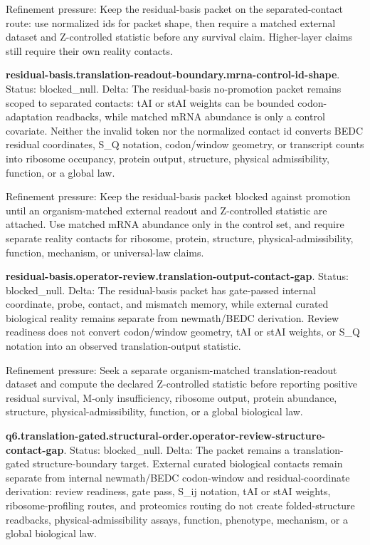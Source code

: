 Refinement pressure: Keep the residual-basis packet on the separated-contact route: use normalized ids for packet shape, then require a matched external dataset and Z-controlled statistic before any survival claim. Higher-layer claims still require their own reality contacts.

\textbf{residual-basis.translation-readout-boundary.mrna-control-id-shape}. Status: blocked\_null. Delta: The residual-basis no-promotion packet remains scoped to separated contacts: tAI or stAI weights can be bounded codon-adaptation readbacks, while matched mRNA abundance is only a control covariate. Neither the invalid token nor the normalized contact id converts BEDC residual coordinates, S\_Q notation, codon/window geometry, or transcript counts into ribosome occupancy, protein output, structure, physical admissibility, function, or a global law.

Refinement pressure: Keep the residual-basis packet blocked against promotion until an organism-matched external readout and Z-controlled statistic are attached. Use matched mRNA abundance only in the control set, and require separate reality contacts for ribosome, protein, structure, physical-admissibility, function, mechanism, or universal-law claims.

\textbf{residual-basis.operator-review.translation-output-contact-gap}. Status: blocked\_null. Delta: The residual-basis packet has gate-passed internal coordinate, probe, contact, and mismatch memory, while external curated biological reality remains separate from newmath/BEDC derivation. Review readiness does not convert codon/window geometry, tAI or stAI weights, or S\_Q notation into an observed translation-output statistic.

Refinement pressure: Seek a separate organism-matched translation-readout dataset and compute the declared Z-controlled statistic before reporting positive residual survival, M-only insufficiency, ribosome output, protein abundance, structure, physical-admissibility, function, or a global biological law.

\textbf{q6.translation-gated.structural-order.operator-review-structure-contact-gap}. Status: blocked\_null. Delta: The packet remains a translation-gated structure-boundary target. External curated biological contacts remain separate from internal newmath/BEDC codon-window and residual-coordinate derivation: review readiness, gate pass, S\_ij notation, tAI or stAI weights, ribosome-profiling routes, and proteomics routing do not create folded-structure readbacks, physical-admissibility assays, function, phenotype, mechanism, or a global biological law.

